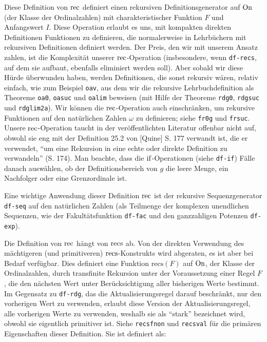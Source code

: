 Diese Definition von ${\rm rec}$ definiert einen rekursiven Definitionsgenerator auf ${\rm On}$ (der Klasse der Ordinalzahlen) mit charakteristischer Funktion $F$ und Anfangswert $I$. Diese Operation erlaubt es uns, mit kompakten direkten Definitionen Funktionen zu definieren, die normalerweise in Lehrbüchern mit rekursiven Definitionen definiert werden. Der Preis, den wir mit unserem Ansatz zahlen, ist die Komplexität unserer ${\rm rec}$-Operation (insbesondere, wenn {\tt df-recs}, auf dem sie aufbaut, ebenfalls eliminiert werden soll). Aber sobald wir diese Hürde überwunden haben, werden Definitionen, die sonst rekursiv wären, relativ einfach, wie zum Beispiel {\tt oav}, aus dem wir die rekursive Lehrbuchdefinition als Theoreme {\tt oa0}, {\tt oasuc} und {\tt oalim} beweisen (mit Hilfe der Theoreme {\tt rdg0}, {\tt rdgsuc} und {\tt rdglim2a}).  Wir können die ${\rm rec}$-Operation auch einschränken, um rekursive Funktionen auf den natürlichen Zahlen $\omega$ zu definieren; siehe {\tt fr0g} und {\tt frsuc}.  Unsere ${\rm rec}$-Operation taucht in der veröffentlichten Literatur offenbar nicht auf, obwohl sie eng mit der Definition 25.2 von [Quine] S. 177 verwandt ist, die er verwendet, "`um eine Rekursion in eine echte oder direkte Definition zu verwandeln"' (S. 174).  Man beachte, dass die ${\rm if}$-Operationen (siehe {\tt df-if}) Fälle danach auswählen, ob der Definitionsbereich von $g$ die leere Menge, ein Nachfolger oder eine Grenzordinale ist.

Eine wichtige Anwendung dieser Definition ${\rm rec}$ ist der rekursive Sequenzgenerator {\tt df-seq} auf den natürlichen Zahlen (als Teilmenge der komplexen unendlichen Sequenzen, wie der Fakultätsfunktion {\tt df-fac} und den ganzzahligen Potenzen {\tt df-exp}).

Die Definition von ${\rm rec}$ hängt von ${\rm recs}$ ab. Von der direkten Verwendung des mächtigeren (und primitiveren) ${\rm recs}$-Konstrukts wird abgeraten, es ist aber bei Bedarf verfügbar. Dies definiert eine Funktion $\mathrm{recs} ( F )$ auf ${\rm On}$, der Klasse der Ordinalzahlen, durch transfinite Rekursion unter der Voraussetzung einer Regel $F$, die den nächsten Wert unter Berücksichtigung aller bisherigen Werte bestimmt. Im Gegensatz zu {\tt df-rdg}, das die Aktualisierungsregel darauf beschränkt, nur den vorherigen Wert zu verwenden, erlaubt diese Version der Aktualisierungsregel, alle vorherigen Werte zu verwenden, weshalb sie als "`stark"' bezeichnet wird, obwohl sie eigentlich primitiver ist.  Siehe {\tt recsfnon} und {\tt recsval} für die primären Eigenschaften dieser Definition. Sie ist definiert als:

